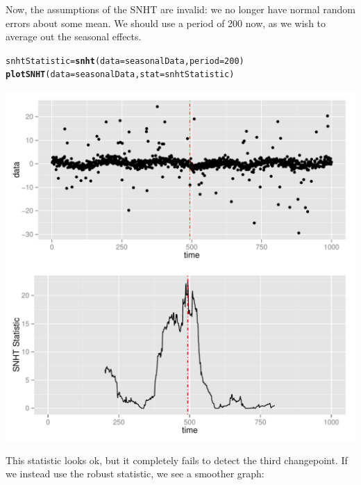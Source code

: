 \documentclass[nojss]{jss}\usepackage[]{graphicx}\usepackage[]{color}
\makeatletter
\def\maxwidth{ %
  \ifdim\Gin@nat@width>\linewidth
    \linewidth
  \else
    \Gin@nat@width
  \fi
}
\newcommand{\hlnum}[1]{\textcolor[rgb]{0.686,0.059,0.569}{#1}}%
\newcommand{\hlstd}[1]{\textcolor[rgb]{0.345,0.345,0.345}{#1}}%
\newcommand{\hlkwb}[1]{\textcolor[rgb]{0.69,0.353,0.396}{#1}}%
\newcommand{\hlkwc}[1]{\textcolor[rgb]{0.333,0.667,0.333}{#1}}%
\newcommand{\hlkwd}[1]{\textcolor[rgb]{0.737,0.353,0.396}{\textbf{#1}}}%
\newenvironment{kframe}{%
 \def\at@end@of@kframe{}%
 \ifinner\ifhmode%
  \def\at@end@of@kframe{\end{minipage}}%
  \begin{minipage}{\columnwidth}%
 \fi\fi%
 \def\FrameCommand##1{\hskip\@totalleftmargin \hskip-\fboxsep
 \colorbox{shadecolor}{##1}\hskip-\fboxsep
     \hskip-\linewidth \hskip-\@totalleftmargin \hskip\columnwidth}%
 \MakeFramed {\advance\hsize-\width
   \@totalleftmargin\z@ \linewidth\hsize
   \@setminipage}}%
 {\par\unskip\endMakeFramed%
 \at@end@of@kframe}
\newenvironment{knitrout}{}{} %
\makeatother
\begin{document}
Now, the assumptions of the SNHT are invalid: we no longer have normal random errors about some mean.  We should use a period of 200 now, as we wish to average out the seasonal effects.

\begin{knitrout}
\color{fgcolor}\begin{kframe}
\begin{alltt}
\hlstd{snhtStatistic} \hlkwb{=} \hlkwd{snht}\hlstd{(}\hlkwc{data} \hlstd{= seasonalData,} \hlkwc{period} \hlstd{=} \hlnum{200}\hlstd{)}
\hlkwd{plotSNHT}\hlstd{(}\hlkwc{data} \hlstd{= seasonalData,} \hlkwc{stat} \hlstd{= snhtStatistic)}
\end{alltt}
\end{kframe}

{\centering \includegraphics[width=\maxwidth]{figure/unnamed-chunk-8-1} 

}



\end{knitrout}

This statistic looks ok, but it completely fails to detect the third changepoint.  If we instead use the robust statistic, we see a smoother graph:
\end{document}
